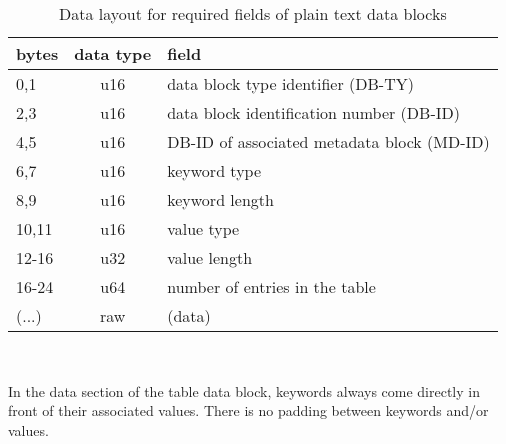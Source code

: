 \documentclass[pagesize=a4]{tufte-book}
\begin{document}
\begin{table}[ht]
	\centering
	\selectfont
	\begin{tabular}{lcl}
		\toprule
		bytes & data type & field\\
		\midrule
		0,1 & u16 & data block type identifier (DB-TY)\\
		2,3 & u16 & data block identification number (DB-ID)\\
		4,5 & u16 & DB-ID of associated metadata block (MD-ID)\\
		6,7 & u16 & keyword type\\
		8,9 & u16 & keyword length\\
		10,11 & u16 & value type\\
		12-16 & u32 & value length\\
		16-24 & u64 & number of entries in the table\\
 		(...) & raw & (data)\\
		\bottomrule
	\end{tabular}
	~\label{tab:table_fields}
	\caption{Data layout for required fields of plain text data blocks}	
\end{table}
\vspace{5mm}

In the data section of the table data block, keywords always come directly in front of their associated values. There is no padding between keywords and/or values.

\backmatter

\printindex
\end{document}

